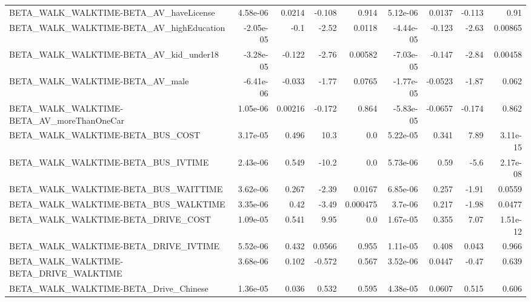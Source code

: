 \begin{tabular}{lrrrrrrrr}
BETA\_WALK\_WALKTIME-BETA\_AV\_haveLicense             &    4.58e-06 &       0.0214 &   -0.108 &    0.914 &   5.12e-06 &      0.0137 &       -0.113 &          0.91 \\
BETA\_WALK\_WALKTIME-BETA\_AV\_highEducation           &   -2.05e-05 &         -0.1 &    -2.52 &   0.0118 &  -4.44e-05 &      -0.123 &        -2.63 &       0.00865 \\
BETA\_WALK\_WALKTIME-BETA\_AV\_kid\_under18             &   -3.28e-05 &       -0.122 &    -2.76 &  0.00582 &  -7.03e-05 &      -0.147 &        -2.84 &       0.00458 \\
BETA\_WALK\_WALKTIME-BETA\_AV\_male                    &   -6.41e-06 &       -0.033 &    -1.77 &   0.0765 &  -1.77e-05 &     -0.0523 &        -1.87 &         0.062 \\
BETA\_WALK\_WALKTIME-BETA\_AV\_moreThanOneCar          &    1.05e-06 &      0.00216 &   -0.172 &    0.864 &  -5.83e-05 &     -0.0657 &       -0.174 &         0.862 \\
BETA\_WALK\_WALKTIME-BETA\_BUS\_COST                   &    3.17e-05 &        0.496 &     10.3 &      0.0 &   5.22e-05 &       0.341 &         7.89 &      3.11e-15 \\
BETA\_WALK\_WALKTIME-BETA\_BUS\_IVTIME                 &    2.43e-06 &        0.549 &    -10.2 &      0.0 &   5.73e-06 &        0.59 &         -5.6 &      2.17e-08 \\
BETA\_WALK\_WALKTIME-BETA\_BUS\_WAITTIME               &    3.62e-06 &        0.267 &    -2.39 &   0.0167 &   6.85e-06 &       0.257 &        -1.91 &        0.0559 \\
BETA\_WALK\_WALKTIME-BETA\_BUS\_WALKTIME               &    3.35e-06 &         0.42 &    -3.49 & 0.000475 &    3.7e-06 &       0.217 &        -1.98 &        0.0477 \\
BETA\_WALK\_WALKTIME-BETA\_DRIVE\_COST                 &    1.09e-05 &        0.541 &     9.95 &      0.0 &   1.67e-05 &       0.355 &         7.07 &      1.51e-12 \\
BETA\_WALK\_WALKTIME-BETA\_DRIVE\_IVTIME               &    5.52e-06 &        0.432 &   0.0566 &    0.955 &   1.11e-05 &       0.408 &        0.043 &         0.966 \\
BETA\_WALK\_WALKTIME-BETA\_DRIVE\_WALKTIME             &    3.68e-06 &        0.102 &   -0.572 &    0.567 &   3.52e-06 &      0.0447 &        -0.47 &         0.639 \\
BETA\_WALK\_WALKTIME-BETA\_Drive\_Chinese              &    1.36e-05 &        0.036 &    0.532 &    0.595 &   4.38e-05 &      0.0607 &        0.515 &         0.606 \\

\end{tabular}
